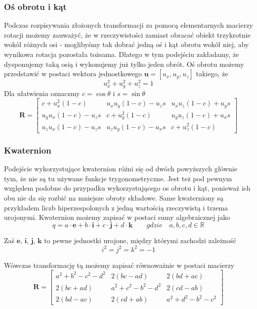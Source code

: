 \documentclass{article}
\begin{document}
\subsubsection*{\Large{Oś obrotu i kąt}}
Podczas rozpisywania złożonych transformacji za pomocą elementarnych macierzy rotacji możemy zauważyć, że w rzeczywistości zamiast obracać obiekt trzykrotnie wokół różnych osi - moglibyśmy tak dobrać jedną oś i kąt obrotu wokół niej, aby wynikowa rotacja pozostała tożsama. Dlatego w tym podejściu zakładamy, że dysponujemy taką osią i wykonujemy już tylko jeden obrót. Oś obrotu możemy przedstawić w postaci wektora jednostkowego $\textbf{u} = [u_x, u_y, u_z]$ takiego, że 
\[u_x^2+u_y^2+u_z^2 = 1 \]
Dla ułatwienia oznaczmy $c = \cos \theta$ i $s = \sin \theta$
\[
\mathbf{R} = \begin{bmatrix}
c+u_{x}^2(1-c) & u_{x}u_{y}(1-c)-u_{z}s & u_{x}u_{z}(1-c)+u_{y}s \\
u_{y}u_{x}(1-c)-u_{z}s & c+u_{y}^2(1-c) & u_{y}u_{z}(1-c)+u_{x}s \\
u_{z}u_{x}(1-c)-u_{z}s & u_{z}u_{y}(1-c)-u_{x}s & c+u_{z}^2(1-c)
\end{bmatrix}
\]

\subsubsection*{\Large{Kwaternion}}
Podejście wykorzystujące kwaternion różni się od dwóch powyższych głównie tym, że nie są tu używane funkcje trygonometryczne. Jest też pod pewnym względem podobne do przypadku wykorzystującego os obrotu i kąt, ponieważ ich obu nie da się rozbić na mniejsze obroty składowe. Same kwaterniony są przykładem liczb hiperzespolonych z jedną wartością rzeczywistą i trzema urojonymi. Kwaternion możemy zapisać w postaci sumy algebraicznej jako
\[q = a \cdot \textbf{e} + b \cdot \textbf{i} + c \cdot \textbf{j} + d \cdot \textbf{k} \qquad gdzie \quad a, b, c, d \in \mathbb{R} \]

Zaś $\textbf{e, i, j, k}$ to pewne jednostki urojone, między którymi zachodzi zależność 
\[i^2 = j^2 = k^2 = -1 \]

Wówczas transformację tą możemy zapisać równoważnie w postaci macierzy
\[
\mathbf{R} = \begin{bmatrix}
a^2+b^2-c^2-d^2 & 2(bc-ad) & 2(bd+ac) \\
2(bc+ad) & a^2+c^2-b^2-d^2 & 2(cd-ab) \\
2(bd-ac) & 2(cd + ab) & a^2+d^2-b^2-c^2
\end{bmatrix}
\]
\end{document}
